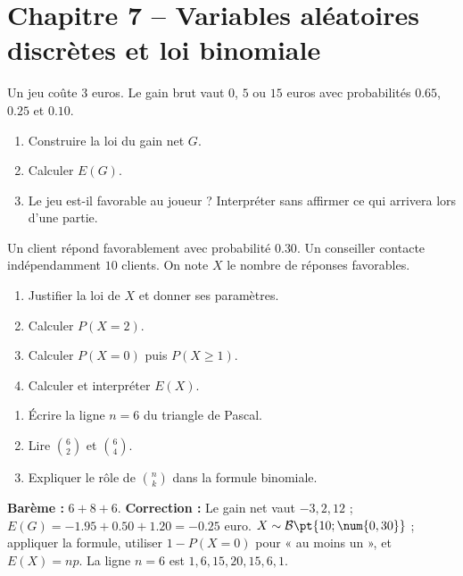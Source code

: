 \section*{Chapitre 7 -- Variables aléatoires discrètes et loi binomiale}
\begin{exercise}
Un jeu coûte $3$ euros. Le gain brut vaut $0$, $5$ ou $15$ euros avec probabilités $\num{0,65}$, $\num{0,25}$ et $\num{0,10}$.
\begin{enumerate}
\item Construire la loi du gain net $G$.
\item Calculer $E(G)$.
\item Le jeu est-il favorable au joueur ? Interpréter sans affirmer ce qui arrivera lors d'une partie.
\end{enumerate}
\end{exercise}
\begin{exercise}
Un client répond favorablement avec probabilité $\num{0,30}$. Un conseiller contacte indépendamment $10$ clients. On note $X$ le nombre de réponses favorables.
\begin{enumerate}
\item Justifier la loi de $X$ et donner ses paramètres.
\item Calculer $P(X=2)$.
\item Calculer $P(X=0)$ puis $P(X\geq1)$.
\item Calculer et interpréter $E(X)$.
\end{enumerate}
\end{exercise}
\begin{exercise}
\begin{enumerate}
\item Écrire la ligne $n=6$ du triangle de Pascal.
\item Lire $\binom62$ et $\binom64$.
\item Expliquer le rôle de $\binom nk$ dans la formule binomiale.
\end{enumerate}
\end{exercise}
\begin{solution}\textbf{Barème :} $6+8+6$. \textbf{Correction :} Le gain net vaut $-3,2,12$ ; $E(G)=-\num{1,95}+\num{0,50}+\num{1,20}=-\num{0,25}$ euro. $X\sim\mathcal B\pt{10;\num{0,30}}$ ; appliquer la formule, utiliser $1-P(X=0)$ pour « au moins un », et $E(X)=np$. La ligne $n=6$ est $1,6,15,20,15,6,1$.\end{solution}

